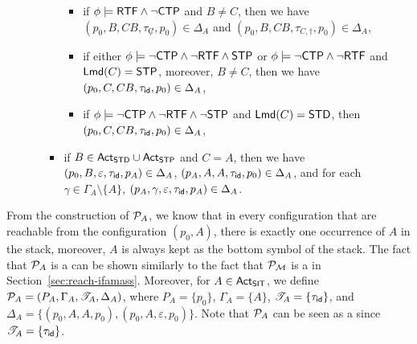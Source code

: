 \begin{itemize}
\begin{itemize}
\begin{itemize}
\begin{itemize}
\begin{itemize}
				\end{itemize}
%
				\item if $\phi \models {\sf RTF} \wedge \neg{\sf CTP}$ and $B\neq C$,  then
                we have $(p_0, B, CB, \tau_{\not C}, p_0) \in \Delta_{A}$ 
                and $(p_0, B, CB, \tau_{C, \dag}, p_0) \in \Delta_{A}$,
%
				\item if either $\phi \models \neg{\sf CTP} \wedge \neg {\sf RTF} \wedge {\sf STP}$ or $\phi \models \neg{\sf CTP} \wedge \neg {\sf RTF}$ and ${\sf Lmd}(C) = {\sf STP}$, moreover, $B \neq C$, then we have $(p_0, C, CB, \tau_{\mathsf{id}}, p_0) \in \Delta_{A}$, 
				\item if $\phi \models \neg{\sf CTP} \wedge \neg {\sf RTF} \wedge \neg {\sf STP}$ and ${\sf Lmd}(C) = {\sf STD}$, then $(p_0, C, CB, \tau_{\mathsf{id}}, p_0) \in \Delta_{A}$,
				\end{itemize}
				
				\item if $B \in {\sf Act}_{\sf STD} \cup {\sf Act}_{\sf STP}$ and $C = A$,  then we have $(p_0, B, \varepsilon, \tau_{\mathsf{id}}, p_A) \in \Delta_{A}$, $(p_A, A, A, \tau_{\mathsf{id}}, p_0)  \in \Delta_{A}$, and for each $\gamma \in \Gamma_A \setminus \{A\}$, $(p_A, \gamma, \varepsilon, \tau_{\mathsf{id}}, p_A) \in \Delta_{A}$. 
            \end{itemize}
        \end{itemize}
\end{itemize}
From the construction of ${\mathcal{P} }_A$, we know that in every configuration that are reachable from the configuration $(p_0, A)$, there is exactly one occurrence of $A$ in the stack, moreover,  $A$ is always kept as the bottom symbol of the stack. 
The fact that ${\mathcal{P} }_{A}$ is a {\WOTrPDS} can be shown similarly to the fact that ${\mathcal{P} }_{\mathcal{M} }$ is a {\WOTrPDS} in Section~\ref{sec:reach-ifamass}.
Moreover, for $A \in {\sf Act}_{\sf SIT}$, we define ${\mathcal{P} }_A = (P_A, \Gamma_A, {\mathscr{T} }_A, \Delta_A)$, where $P_A = \{p_0\}$, $\Gamma_A = \{A\}$, ${\mathscr{T} }_A = \{\tau_{\mathsf{id}}\}$, and $\Delta_A = \{(p_0, A, A, p_0), (p_0, A, \varepsilon, p_0)\}$. Note that ${\mathcal{P} }_A$ can be seen as a {\PDS} since ${\mathscr{T} }_A = \{\tau_{\mathsf{id}}\}$.


